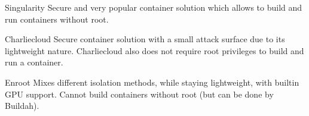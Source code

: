 \documentclass[hyperref={pdfpagelabels=false},aspectratio=169]{beamer}
\begin{document}
%
    \begin{frame}
      \begin{block}{Singularity}
Secure and very popular container solution which allows to build and run containers without root.
      \end{block}
      \begin{block}{Charliecloud}
Secure container solution with a small attack surface due to its lightweight nature. Charliecloud also does not require root privileges to build and run a container.
      \end{block}
      \begin{block}{Enroot}
Mixes different isolation methods, while staying lightweight, with builtin GPU support. Cannot build containers without root (but can be done by Buildah).
      \end{block}
    \end{frame}
\end{document}
